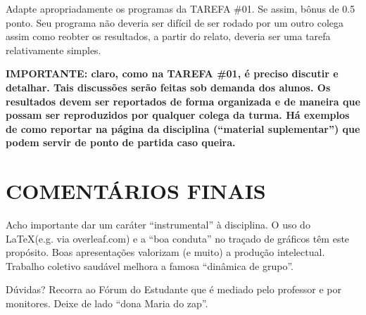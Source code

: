 \documentclass{article}
\begin{document}
\vspace{5mm}


Adapte apropriadamente os programas da TAREFA \#01. Se assim, bônus de 0.5 ponto. Seu programa não deveria ser difícil de ser rodado por um outro colega assim como reobter os resultados, a partir do relato, deveria ser uma tarefa relativamente simples.

\vspace{3mm}\noindent
{\bf IMPORTANTE: claro, como na TAREFA \#01, é preciso discutir e detalhar. Tais discussões serão feitas sob demanda dos alunos. Os resultados devem ser reportados de forma organizada e de maneira que possam ser reproduzidos por qualquer colega da turma. Há exemplos de como reportar na página da disciplina (``material suplementar'') que podem servir de ponto de partida caso queira.}

\section{COMENTÁRIOS FINAIS}
    Acho importante dar um caráter ``instrumental'' à disciplina. O uso do \LaTeX\quad (e.g. via overleaf.com) e a ``boa conduta'' no traçado de gráficos têm este propósito. Boas apresentações valorizam (e muito) a produção intelectual. Trabalho coletivo saudável melhora a famosa ``dinâmica de grupo''. 
    
\vspace{5mm}
Dúvidas? Recorra ao Fórum do Estudante que é mediado pelo professor e por monitores. Deixe de lado ``dona Maria do zap''.
\end{document}
